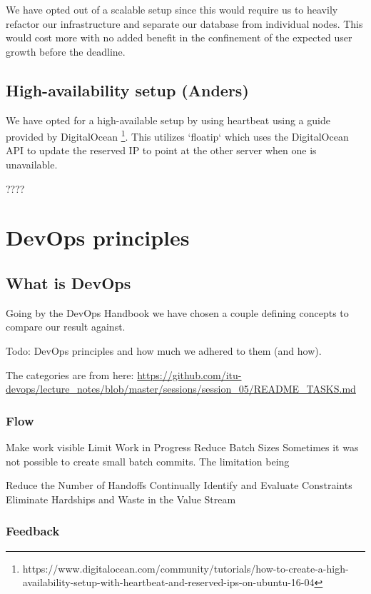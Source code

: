 \documentclass{article}
\begin{document}
We have opted out of a scalable setup since this would require us to heavily refactor our infrastructure and separate our database from individual nodes. This would cost more with no added benefit in the confinement of the expected user growth before the deadline.  

\subsection{High-availability setup (Anders)}

We have opted for a high-available setup by using heartbeat using a guide provided by DigitalOcean \footnote{https://www.digitalocean.com/community/tutorials/how-to-create-a-high-availability-setup-with-heartbeat-and-reserved-ips-on-ubuntu-16-04}. This utilizes `floatip` which uses the DigitalOcean API to update the reserved IP to point at the other server when one is unavailable. 

????


\section{DevOps principles}

\subsection{What is DevOps}

Going by the DevOps Handbook \cite{devopshandbook} we have chosen a couple defining concepts to compare our result against. 

Todo: DevOps principles and how much we adhered to them (and how).

The categories are from here:
\url{https://github.com/itu-devops/lecture_notes/blob/master/sessions/session_05/README_TASKS.md}

\subsubsection{Flow}

Make work visible
Limit Work in Progress
Reduce Batch Sizes
Sometimes it was not possible to create small batch commits. The limitation being 

    Reduce the Number of Handoffs
    Continually Identify and Evaluate Constraints
    Eliminate Hardships and Waste in the Value Stream



\subsubsection{Feedback}
\end{document}
